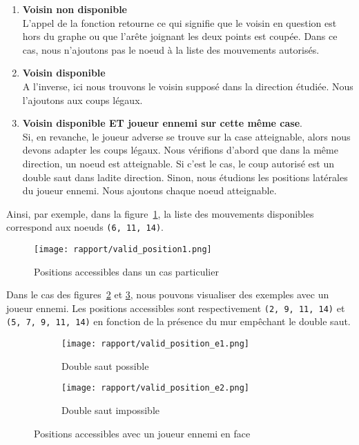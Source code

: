 \documentclass[a4paper]{article}
\begin{document}
\begin{enumerate}
    \item \textbf{Voisin non disponible} \\
L'appel de la fonction retourne  ce qui signifie que le voisin en question est hors du graphe ou que l'arête joignant les deux points est coupée. Dans ce cas, nous n'ajoutons pas le noeud à la liste des mouvements autorisés.
    \item \textbf{Voisin disponible} \\
A l'inverse, ici nous trouvons le voisin supposé dans la direction étudiée. Nous l'ajoutons aux coups légaux. 
    \item \textbf{Voisin disponible ET joueur ennemi sur cette même case}. \\
Si, en revanche, le joueur adverse se trouve sur la case atteignable, alors nous devons adapter les coups légaux. Nous vérifions d'abord que dans la même direction, un noeud est atteignable. Si c'est le cas, le coup autorisé est un double saut dans ladite direction. Sinon, nous étudions les positions latérales du joueur ennemi. Nous ajoutons chaque noeud atteignable. \\
\end{enumerate}

Ainsi, par exemple, dans la figure~\ref{fig:valid_pos1}, la liste des mouvements disponibles correspond aux noeuds \texttt{(6, 11, 14)}.

\begin{figure}[h!]
    \centering
    \texttt{[image: rapport/valid\_position1.png]}
    \caption{Positions accessibles dans un cas particulier}
    \label{fig:valid_pos1}
\end{figure}

Dans le cas des figures~\ref{fig:valid_pos_e1} et \ref{fig:valid_pos_e2}, nous pouvons visualiser des exemples avec un joueur ennemi. Les positions accessibles sont respectivement \texttt{(2, 9, 11, 14)} et \texttt{(5, 7, 9, 11, 14)} en fonction de la présence du mur empêchant le double saut.

\begin{figure}[h]
    \centering
    \begin{subfigure}{.5\textwidth}
        \centering
        \texttt{[image: rapport/valid\_position\_e1.png]}
        \caption{Double saut possible}
        \label{fig:valid_pos_e1}
    \end{subfigure}%
    \begin{subfigure}{.5\textwidth}
        \centering
        \texttt{[image: rapport/valid\_position\_e2.png]}
        \caption{Double saut impossible}
        \label{fig:valid_pos_e2}
    \end{subfigure}
    
    \caption{Positions accessibles avec un joueur ennemi en face}
    \label{fig:valid_pos_ennemy}
\end{figure}
\end{document}
